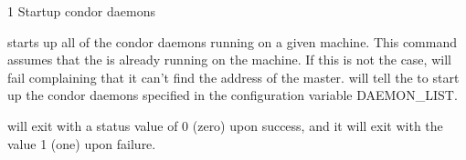 \begin{ManPage}{\label{man-condor-on}}{1}
{Startup condor daemons}
\Synopsis {}

\ToolArgs


\Description 

 starts up all of the condor daemons running on a given
machine.  This command assumes that the  is already
running on the machine.  If this is not the case,  will
fail complaining that it can't find the address of the master.  
will tell the  to start up the condor daemons specified
in the configuration variable DAEMON\_LIST.

\begin{Options}
	\ToolArgsDesc
\end{Options}

\ExitStatus

 will exit with a status value of 0 (zero) upon success,
and it will exit with the value 1 (one) upon failure.

\end{ManPage}

